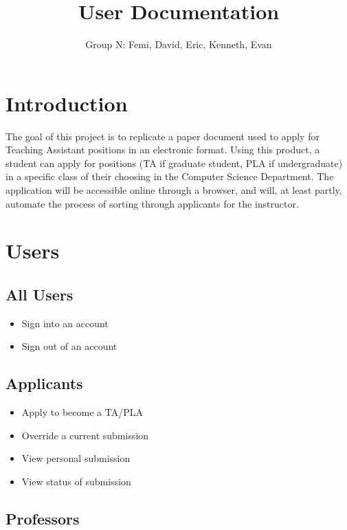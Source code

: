 \documentclass[11pt]{amsart}
\title{User Documentation}
\author{Group N: Femi, David, Eric, Kenneth, Evan}
\begin{document}
\maketitle
\section{Introduction}
\noindent The goal of this project is to replicate a paper document used to apply for Teaching Assistant positions in an electronic format. Using this product, a student can apply for positions (TA if graduate student, PLA if undergraduate) in a specific class of their choosing in the Computer Science Department. The application will be accessible online through a browser, and will, at least partly, automate the process of sorting through applicants for the instructor.
\section{Users}


\subsection{All Users}

\begin{itemize}
    \item{Sign into an account}
    \item{Sign out of an account}
\end{itemize}

\subsection{Applicants}

\begin{itemize}
    \item{Apply to become a TA/PLA}
    \item{Override a current submission}
    \item{View personal submission}
    \item{View status of submission}
\end{itemize}

\subsection{Professors}
\end{document}
